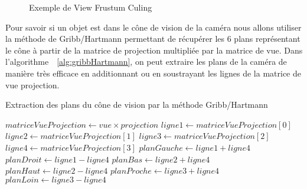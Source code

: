 \begin{figure}[H]
	\begin{center}
	\end{center}
	\caption{Exemple de \og View Frustum Culing\fg}
	\label{fig:frustum culing}
\end{figure}

Pour savoir si un objet est dans le cône de vision de la caméra nous allons utiliser la méthode de Gribb/Hartmann\citep{gribbHartman} permettant de récupérer les 6 plans représentant le cône à partir de la matrice de projection multipliée par la matrice de vue. Dans l'algorithme~\ \autoref{alg:gribbHartmann}, on peut extraire les plans de la caméra de manière très efficace en additionnant ou en soustrayant les lignes de la matrice de vue projection.



\begin{algorithm}[H]
	\caption{Extraction des plans du cône de vision par la méthode Gribb/Hartmann}
	\label{alg:gribbHartmann}
	\begin{algorithmic}
		
		\State $matriceVueProjection \gets vue \times projection$
		\newline
		\State $ligne1 \gets matriceVueProjection[0]$
		\State $ligne2 \gets matriceVueProjection[1]$
		\State $ligne3 \gets matriceVueProjection[2]$
		\State $ligne4 \gets matriceVueProjection[3]$
		\newline
		\State $planGauche \gets ligne1 + ligne4$
		\State $planDroit \gets ligne1 - ligne4$
		\State $planBas \gets ligne2 + ligne4$
		\State $planHaut \gets ligne2 - ligne4$
		\State $planProche \gets ligne3 + ligne4$
		\State $planLoin \gets ligne3 - ligne4$
		
	\end{algorithmic}
\end{algorithm}

